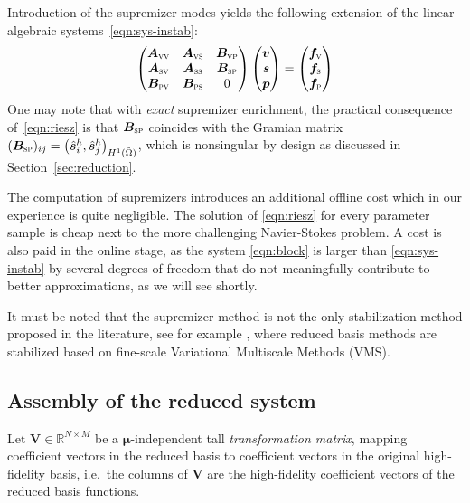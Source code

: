 \documentclass[onecolumn, twoside, a4paper, 11pt]{article}
\begin{document}
Introduction of the supremizer modes yields the following extension of the linear-algebraic
systems~\eqref{eqn:sys-instab}:
%
\begin{equation}
  \label{eqn:block}
  \begin{pmatrix}
    \bm A_\textsc{vv} & \bm A_\textsc{vs} & \bm B_\textsc{vp} \\
    \bm A_\textsc{sv} & \bm A_\textsc{ss} & \bm B_\textsc{sp} \\
    \bm B_\textsc{pv} & \bm B_\textsc{ps} & 0 \end{pmatrix}
  \begin{pmatrix} \bm v \\ \bm s \\ \bm p \end{pmatrix}
  =
  \begin{pmatrix} \bm f_\textsc{v} \\ \bm f_\textsc{s} \\ \bm f_\textsc{p} \end{pmatrix}
\end{equation}
%
One may note that with \emph{exact} supremizer enrichment, the practical
consequence of~\eqref{eqn:riesz} is that $\bm B_\textsc{sp}$ coincides
with the Gramian matrix $(\bm B_\textsc{sp})_{ij}=\left( \hat{\bm s}^h_i, \hat{\bm s}^h_j \right)_{H^1(\hat{\Omega})}$,
which is nonsingular by design as discussed in Section~\ref{sec:reduction}.

The computation of supremizers introduces an additional offline cost which in
our experience is quite negligible. The solution of \eqref{eqn:riesz} for every
parameter sample is cheap next to the more challenging Navier-Stokes problem. A
cost is also paid in the online stage, as the system \eqref{eqn:block} is larger
than \eqref{eqn:sys-instab} by several degrees of freedom that do not
meaningfully contribute to better approximations, as we will see shortly.

It must be noted that the supremizer method is not the only stabilization method
proposed in the literature, see for example
\cite{Weller2008nml,Bergmann2009erp}, where reduced basis methods are stabilized
based on fine-scale Variational Multiscale Methods (VMS).


\subsection{Assembly of the reduced system}
Let $\bm V \in \mathbb{R}^{N \times M}$ be a $\bm \mu$-independent
tall \emph{transformation matrix}, mapping coefficient vectors in the
reduced basis to coefficient vectors in the original high-fidelity
basis, i.e.~the columns of $\bm V$ are the high-fidelity coefficient
vectors of the reduced basis functions.
\end{document}

